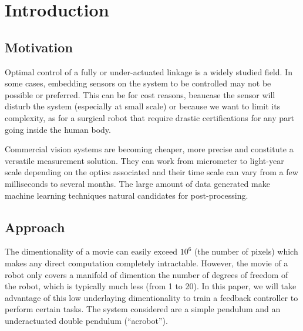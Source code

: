 \section{Introduction}

\subsection{Motivation}

Optimal control of a fully or under-actuated linkage is a widely studied field. In some cases, embedding sensors on the system to be controlled may not be possible or preferred. This can be for cost reasons, beaucase the sensor will disturb the system (especially at small scale) or because we want to limit its complexity, as for a surgical robot that require drastic certifications for any part going inside the human body.

Commercial vision systems are becoming cheaper, more precise and constitute a versatile measurement solution. They can work from micrometer to light-year scale depending on the optics associated and their time scale can vary from a few milliseconds to several months. The large amount of data generated make machine learning techniques natural candidates for post-processing.

\subsection{Approach}

The dimentionality of a movie can easily exceed $10^6$ (the number of pixels) which makes any direct computation completely intractable. However, the movie of a robot only covers a manifold of dimention the number of degrees of freedom of the robot, which is typically much less (from 1 to 20). In this paper, we will take advantage of this low underlaying dimentionality to train a feedback controller to perform certain tasks. The system considered are a simple pendulum and an underactuated double pendulum (\textquotedblleft acrobot\textquotedblright).